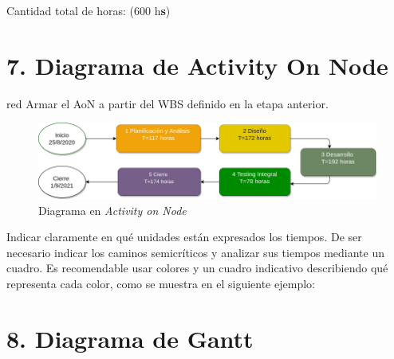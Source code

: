 \documentclass[11pt]{charter}
\begin{document}
Cantidad total de horas: (600 h\textbf{s})


\section{7. Diagrama de Activity On Node}
\label{sec:AoN}

\begin{consigna}{red}
Armar el AoN a partir del WBS definido en la etapa anterior. 



\end{consigna}

\begin{figure}[htpb]
\centering 
\includegraphics[width=.8\textwidth]{./Figuras/AoN.png}
\caption{Diagrama en \textit{Activity on Node}}
\label{fig:AoN}
\end{figure}

Indicar claramente en qué unidades están expresados los tiempos.
De ser necesario indicar los caminos semicríticos y analizar sus tiempos mediante un cuadro.
Es recomendable usar colores y un cuadro indicativo describiendo qué representa cada color, como se muestra en el siguiente ejemplo:



\section{8. Diagrama de Gantt}
\label{sec:gantt}
\end{document}
